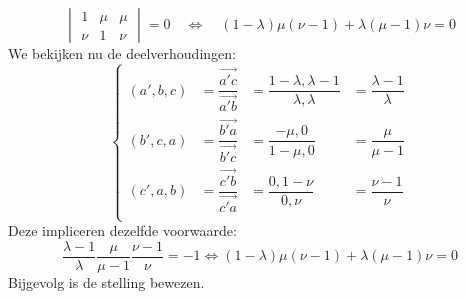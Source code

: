 \documentclass[main.tex]{subfiles}
\begin{document}
\begin{st}
\[\begin{vmatrix}
    1 & \mu & \mu \\
    \nu & 1 & \nu
  \end{vmatrix}
  = 0
  \quad\Leftrightarrow\quad
  (1 - \lambda)\mu(\nu-1) + \lambda(\mu-1)\nu = 0
  \]
  We bekijken nu de deelverhoudingen:
  \[
  \left\{
  \begin{array}{rlll}
  (a',b,c) &= \dfrac{\overrightarrow{a'c}}{\overrightarrow{a'b}} &= \dfrac{1-\lambda,\lambda-1}{\lambda,\lambda} &= \dfrac{\lambda-1}{\lambda}\\
  (b',c,a) &= \dfrac{\overrightarrow{b'a}}{\overrightarrow{b'c}} &= \dfrac{-\mu,0}{1-\mu,0} &= \dfrac{\mu}{\mu-1}\\
  (c',a,b) &= \dfrac{\overrightarrow{c'b}}{\overrightarrow{c'a}} &= \dfrac{0,1-\nu}{0,\nu} &= \dfrac{\nu -1}{\nu}\\
  \end{array}
  \right.
  \]
  Deze impliceren dezelfde voorwaarde:
  \[
  \dfrac{\lambda-1}{\lambda}\dfrac{\mu}{\mu-1}\dfrac{\nu -1}{\nu} = -1
  \Leftrightarrow
  (1 - \lambda)\mu(\nu-1) + \lambda(\mu-1)\nu = 0
  \]
  Bijgevolg is de stelling bewezen.
\end{st}
\end{document}
